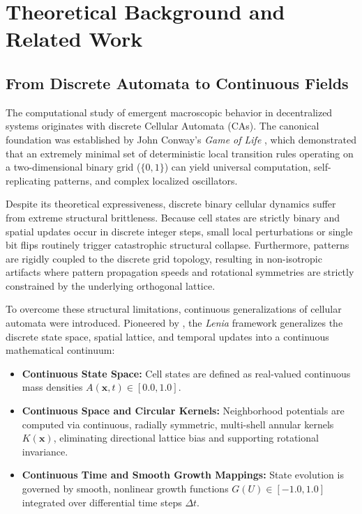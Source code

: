\section{Theoretical Background and Related Work}
\label{sec:theoretical_background}

\subsection{From Discrete Automata to Continuous Fields}
\label{subsec:bg_discrete_to_continuous}

The computational study of emergent macroscopic behavior in decentralized systems originates with discrete Cellular Automata (CAs). The canonical foundation was established by John Conway's \textit{Game of Life} \parencite{gardner1970game}, which demonstrated that an extremely minimal set of deterministic local transition rules operating on a two-dimensional binary grid ($\{0, 1\}$) can yield universal computation, self-replicating patterns, and complex localized oscillators. 

Despite its theoretical expressiveness, discrete binary cellular dynamics suffer from extreme structural brittleness. Because cell states are strictly binary and spatial updates occur in discrete integer steps, small local perturbations or single bit flips routinely trigger catastrophic structural collapse. Furthermore, patterns are rigidly coupled to the discrete grid topology, resulting in non-isotropic artifacts where pattern propagation speeds and rotational symmetries are strictly constrained by the underlying orthogonal lattice.

To overcome these structural limitations, continuous generalizations of cellular automata were introduced. Pioneered by \textcite{chan2019lenia, chan2020lenia}, the \textit{Lenia} framework generalizes the discrete state space, spatial lattice, and temporal updates into a continuous mathematical continuum:
\begin{itemize}
    \item \textbf{Continuous State Space:} Cell states are defined as real-valued continuous mass densities $A(\mathbf{x}, t) \in [0.0, 1.0]$.
    \item \textbf{Continuous Space and Circular Kernels:} Neighborhood potentials are computed via continuous, radially symmetric, multi-shell annular kernels $K(\mathbf{x})$, eliminating directional lattice bias and supporting rotational invariance.
    \item \textbf{Continuous Time and Smooth Growth Mappings:} State evolution is governed by smooth, nonlinear growth functions $G(U) \in [-1.0, 1.0]$ integrated over differential time steps $\Delta t$.
\end{itemize}

